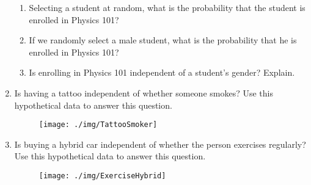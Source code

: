 \begin{enumerate}
\begin{enumerate}
\item Selecting a student at random, what is the probability that the student is enrolled in Physics 101?\\[.5cm]
\item If we randomly select a male student, what is the probability that he is enrolled in Physics 101? \\[.5cm]
\item Is enrolling in Physics 101 independent of a student's gender? Explain.\\[.5cm]
\end{enumerate}
\item Is having a tattoo independent of whether someone smokes? Use this hypothetical data to answer this question.
\begin{figure}[H]
\centering{}\texttt{[image: ./img/TattooSmoker]} 
\end{figure}
\vspace{.5in}
\item Is buying a hybrid car independent of whether the person exercises regularly? Use this hypothetical data to answer this question.
\begin{figure}[H]
\centering{}\texttt{[image: ./img/ExerciseHybrid]} 
\end{figure}

\end{enumerate}

